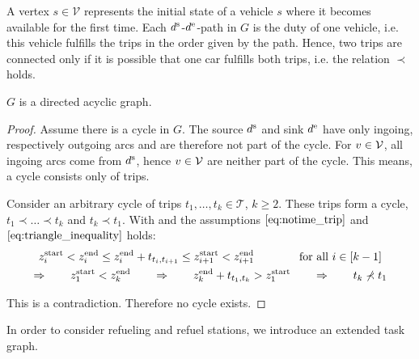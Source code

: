 A vertex $s\in\mathcal{V}$ represents the initial state of a vehicle $s$ where it becomes available for the first time. Each $d^{\operatorname{s}}$-$d^{\operatorname{e}}$-path in $G$ is the duty of one vehicle, i.e. this vehicle fulfills the trips in the order given by the path. Hence, two trips are connected only if it is possible that one car fulfills both trips, i.e. the relation $\prec$ holds.

\begin{lemma}
\label{lem:taskgraph_cyclefree}

$G$ is a directed acyclic graph.

\end{lemma}

\begin{proof}

Assume there is a cycle in $G$. The source $d^{\operatorname{s}}$ and sink $d^{\operatorname{e}}$ have only ingoing, respectively outgoing arcs and are therefore not part of the cycle. For $v\in\mathcal{V}$, all ingoing arcs come from $d^{\operatorname{s}}$, hence $v\in\mathcal{V}$ are neither part of the cycle. This means, a cycle consists only of trips.

Consider an arbitrary cycle of trips $t_1,\dots,t_k\in\mathcal{T}$, $k\geq 2$. These trips form a cycle, \ie ${t_1\prec\dots\prec t_k}$ and ${t_k\prec t_1}$. With  and the assumptions $\eqref{eq:notime_trip}$ and $\eqref{eq:triangle_inequality}$ holds:
\begin{gather*}
	z^{\operatorname{start}}_i < z^{\operatorname{end}}_i \leq z^{\operatorname{end}}_i + t_{t_i,t_{i+1}} \leq z^{\operatorname{start}}_{i+1} < z^{\operatorname{end}}_{i+1} \qquad\qquad \text{for all } i\in[k-1] \\
	\Rightarrow \qquad z^{\operatorname{start}}_1 < z^{\operatorname{end}}_k \qquad \Rightarrow \qquad z^{\operatorname{end}}_k + t_{t_1,t_k} > z^{\operatorname{start}}_1 \qquad \Rightarrow \qquad t_k\not\prec t_1
\end{gather*}

This is a contradiction. Therefore no cycle exists.
%
\end{proof}

In order to consider refueling and refuel stations, we introduce an extended task graph.


